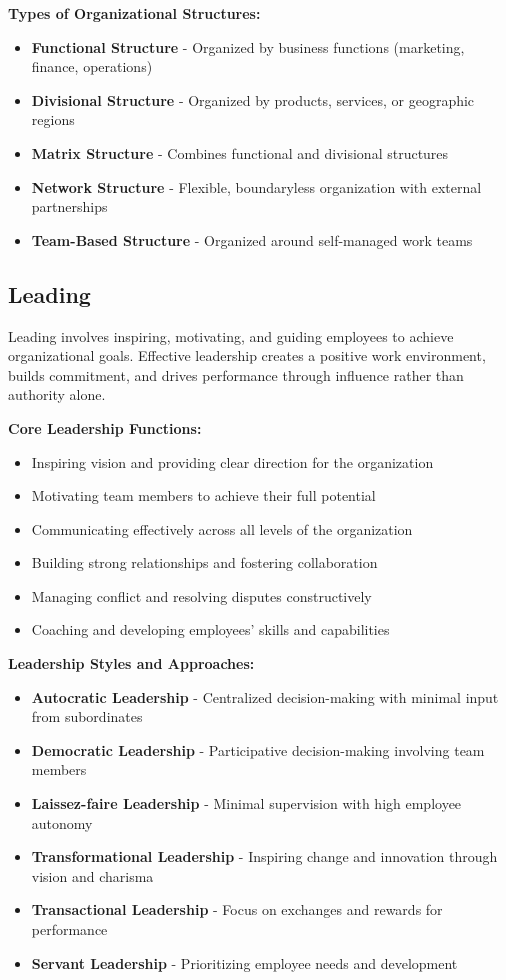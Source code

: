 \documentclass[12pt]{article}
\begin{document}
\textbf{Types of Organizational Structures:}
\begin{itemize}
    \item \textbf{Functional Structure} - Organized by business functions (marketing, finance, operations)
    \item \textbf{Divisional Structure} - Organized by products, services, or geographic regions
    \item \textbf{Matrix Structure} - Combines functional and divisional structures
    \item \textbf{Network Structure} - Flexible, boundaryless organization with external partnerships
    \item \textbf{Team-Based Structure} - Organized around self-managed work teams
\end{itemize}

\subsection{Leading}
Leading involves inspiring, motivating, and guiding employees to achieve organizational goals. Effective leadership creates a positive work environment, builds commitment, and drives performance through influence rather than authority alone.

\textbf{Core Leadership Functions:}
\begin{itemize}
    \item Inspiring vision and providing clear direction for the organization
    \item Motivating team members to achieve their full potential
    \item Communicating effectively across all levels of the organization
    \item Building strong relationships and fostering collaboration
    \item Managing conflict and resolving disputes constructively
    \item Coaching and developing employees' skills and capabilities
\end{itemize}

\textbf{Leadership Styles and Approaches:}
\begin{itemize}
    \item \textbf{Autocratic Leadership} - Centralized decision-making with minimal input from subordinates
    \item \textbf{Democratic Leadership} - Participative decision-making involving team members
    \item \textbf{Laissez-faire Leadership} - Minimal supervision with high employee autonomy
    \item \textbf{Transformational Leadership} - Inspiring change and innovation through vision and charisma
    \item \textbf{Transactional Leadership} - Focus on exchanges and rewards for performance
    \item \textbf{Servant Leadership} - Prioritizing employee needs and development
\end{itemize}
\end{document}
